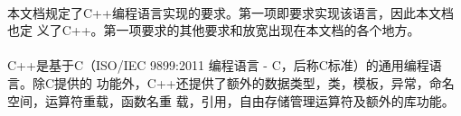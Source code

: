 \paragraph{}
本文档规定了C++编程语言实现的要求。第一项即要求实现该语言，因此本文档也定
义了C++。第一项要求的其他要求和放宽出现在本文档的各个地方。
\paragraph{}
C++是基于C（ISO/IEC 9899:2011 编程语言 - C，后称C标准）的通用编程语言。除C提供的
功能外，C++还提供了额外的数据类型，类，模板，异常，命名空间，运算符重载，函数名重
载，引用，自由存储管理运算符及额外的库功能。

